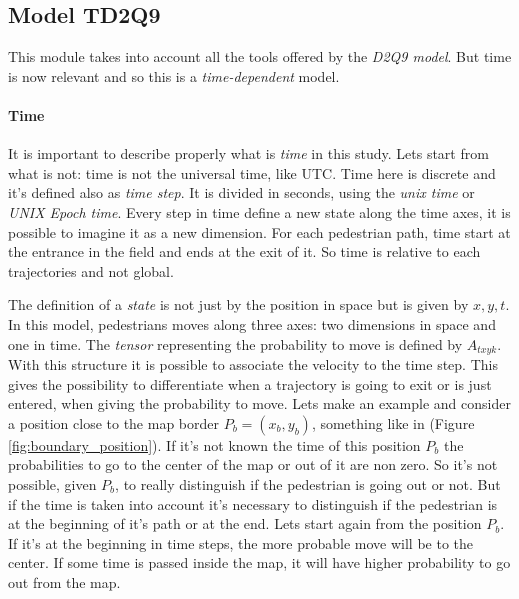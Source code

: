 \documentclass[class=article, crop=false]{standalone}
\begin{document}
\subsection{Model TD2Q9}
This module takes into account all the tools offered by the \emph{D2Q9 model}.
But time is now relevant and so this is a \emph{time-dependent} model.
\paragraph{Time}
It is important to describe properly what is \emph{time} in this study.
Lets start from what is not: time is not the universal time, like UTC.
Time here is discrete and it's defined also as \emph{time step}.
It is divided in seconds, using the \emph{unix time} or \emph{UNIX Epoch time}.
Every step in time define a new state along the time axes, it is possible to imagine it as a new dimension.
For each pedestrian path, time start at the entrance in the field and ends at the exit of it.
So time is relative to each trajectories and not global.

The definition of a \emph{state} is not just by the position in space but is given by $x, y, t$.
In this model, pedestrians moves along three axes: two dimensions in space and one in time.
The \emph{tensor} representing the probability to move is defined by $A_{t x y k}$.
With this structure it is possible to associate the velocity to the time step.
This gives the possibility to differentiate when a trajectory is going to exit or is just entered, when giving the probability to move.
Lets make an example and consider a position close to the map border $P_b = (x_b, y_b)$, something like in (Figure \ref{fig:boundary_position}).
If it's not known the time of this position $P_b$ the probabilities to go to the center of the map or out of it are non zero.
So it's not possible, given $P_b$, to really distinguish if the pedestrian is going out or not.
But if the time is taken into account it's necessary to distinguish if the pedestrian is at the beginning of it's path or at the end.
Lets start again from the position $P_b$.
If it's at the beginning in time steps, the more probable move will be to the center.
If some time is passed inside the map, it will have higher probability to go out from the map.
\end{document}
